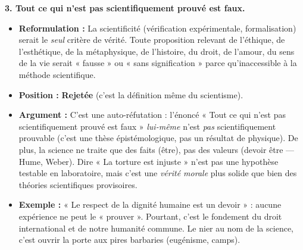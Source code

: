 \documentclass[11pt]{article}
\newcommand{\cle}[1]{{\popxbold\color{popdark}#1}}
\begin{document}
\begin{corrige}
\textbf{3. Tout ce qui n'est pas scientifiquement prouvé est faux.}
\begin{itemize}
\item \textbf{Reformulation :} La scientificité (vérification expérimentale, formalisation) serait le \emph{seul} critère de vérité. Toute proposition relevant de l'éthique, de l'esthétique, de la métaphysique, de l'histoire, du droit, de l'amour, du sens de la vie serait « fausse » ou « sans signification » parce qu'inaccessible à la méthode scientifique.
\item \textbf{Position :} \textbf{Rejetée} (c'est la définition même du \cle{scientisme}).
\item \textbf{Argument :} C'est une \cle{auto-réfutation} : l'énoncé « Tout ce qui n'est pas scientifiquement prouvé est faux » \emph{lui-même} n'est \emph{pas} scientifiquement prouvable (c'est une thèse épistémologique, pas un résultat de physique). De plus, la science ne traite que des \cle{faits} (être), pas des \cle{valeurs} (devoir être — Hume, Weber). Dire « La torture est injuste » n'est pas une hypothèse testable en laboratoire, mais c'est une \emph{vérité morale} plus solide que bien des théories scientifiques provisoires.
\item \textbf{Exemple :} « Le respect de la dignité humaine est un devoir » : aucune expérience ne peut le « prouver ». Pourtant, c'est le fondement du droit international et de notre humanité commune. Le nier au nom de la science, c'est ouvrir la porte aux pires barbaries (eugénisme, camps).
\end{itemize}


\end{corrige}
\end{document}
